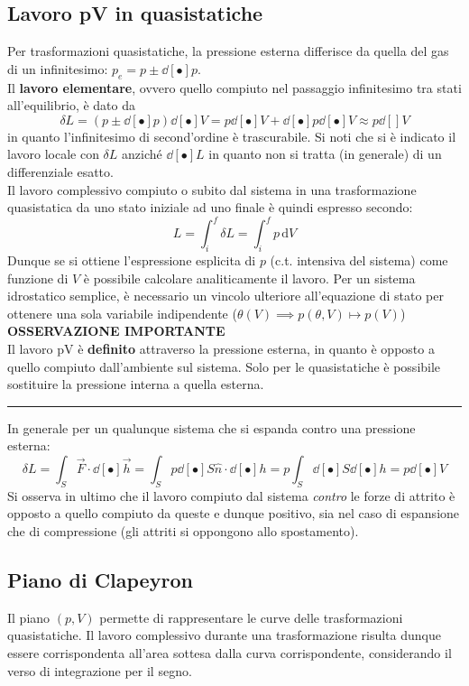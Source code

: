 \documentclass[10pt, oneside]{book}
\newcommand{\infobox}[2]{\vspace{0.5cm}~\\ \textbf{#1} \hrulefill \vspace{0.2cm}\\#2 \\\hrule \vspace{0.5cm}}
\newcommand{\ds}{\displaystyle}
\newcommand{\integral}[4]{\int_{#1}^{#2} #3 \, \mathrm{d}#4}
\begin{document}
\subsection{Lavoro pV in quasistatiche}
Per trasformazioni quasistatiche, la pressione esterna differisce da quella del gas di un infinitesimo: $\ds p_e = p \pm \dd[•]{p}$.\\
Il \textbf{lavoro elementare}, ovvero quello compiuto nel passaggio infinitesimo tra stati all'equilibrio, è dato da
\[\delta L = (p \pm \dd[•]{p}) \dd[•]{V} = p \dd[•]{V} + \dd[•]{p} \dd[•]{V} \approx p \dd[]{V}\]
in quanto l'infinitesimo di second'ordine è trascurabile. Si noti che si è indicato il lavoro locale con $\delta L$ anziché $\dd[•]{L}$ in quanto non si tratta (in generale) di un differenziale esatto.\\
Il lavoro complessivo compiuto o subito dal sistema in una trasformazione quasistatica da uno stato iniziale ad uno finale è quindi espresso secondo:
\[L = \int_i^f \delta L = \integral{i}{f}{p}{V}\]
Dunque se si ottiene l'espressione esplicita di $p$ (c.t. intensiva del sistema) come funzione di $V$ è possibile calcolare analiticamente il lavoro. Per un sistema idrostatico semplice, è necessario un vincolo ulteriore all'equazione di stato per ottenere una sola variabile indipendente ($\theta (V) \implies p(\theta, V) \mapsto p(V)$)
\infobox{OSSERVAZIONE IMPORTANTE}{Il lavoro pV è \textbf{definito} attraverso la pressione esterna, in quanto è opposto a quello compiuto dall'ambiente sul sistema. Solo per le quasistatiche è possibile sostituire la pressione interna a quella esterna.}
In generale per un qualunque sistema che si espanda contro una pressione esterna:
\[\delta L = \int_S \vec{F} \cdot \dd[•]{\vec{h}} = \int_S p \dd[•]{S} \hat{n} \cdot \dd[•]{h} = p \int_S \dd[•]{S} \dd[•]{h} = p \dd[•]{V}\]
Si osserva in ultimo che il lavoro compiuto dal sistema \textit{contro} le forze di attrito è opposto a quello compiuto da queste e dunque positivo, sia nel caso di espansione che di compressione (gli attriti si oppongono allo spostamento).


\subsection{Piano di Clapeyron}
Il piano $(p,V)$ permette di rappresentare le curve delle trasformazioni quasistatiche. Il lavoro complessivo durante una trasformazione risulta dunque essere corrispondenta all'area sottesa dalla curva corrispondente, considerando il verso di integrazione per il segno. 
\end{document}
